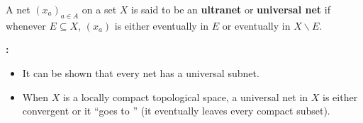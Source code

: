 \documentclass[12pt]{article}
\begin{document}
A net $(x_a)_{a\in A}$ on a set $X$ is said to be an {\bf ultranet} or {\bf universal net} if whenever $E\subseteq X$, $(x_a)$ is either eventually in $E$ or eventually in $X\smallsetminus E$.


{\bf {}:}
\begin{itemize}
\item It can be shown that every net has a universal subnet.
\item When $X$ is a locally compact topological space, a universal net in $X$ is either convergent or it ``goes to '' (it eventually leaves every compact subset).
\end{itemize}
\end{document}

